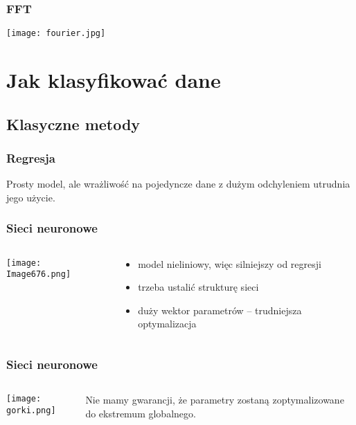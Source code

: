\documentclass{beamer}
\begin{document}
\begin{frame} \frametitle{FFT}
\texttt{[image: fourier.jpg]}
\end{frame}

\section{Jak klasyfikować dane}
\subsection{Klasyczne metody}
\begin{frame} \frametitle{Regresja}
Prosty model, ale wrażliwość na pojedyncze dane z dużym odchyleniem utrudnia jego użycie.
\end{frame}

\begin{frame} \frametitle{Sieci neuronowe}
\begin{columns}
\begin{column}{5cm}
 \texttt{[image: Image676.png]}
\end{column}

 \begin{column}{5cm}
\begin{itemize}
 \item model nieliniowy, więc silniejszy od regresji
 \item trzeba ustalić strukturę sieci \pause
 \item duży wektor parametrów -- trudniejsza optymalizacja \pause
\end{itemize}  
 \end{column}

\end{columns}


\end{frame}

\begin{frame} \frametitle{Sieci neuronowe}
\begin{columns}
\begin{column}{5cm}
\texttt{[image: gorki.png]}
\end{column}
\begin{column}{5cm}
Nie mamy gwarancji, że parametry zostaną zoptymalizowane do ekstremum globalnego.
\end{column}
\end{columns}
\end{frame}
\end{document}
